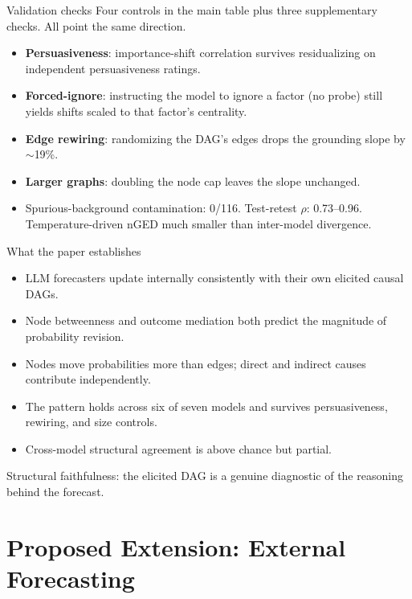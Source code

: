 \documentclass[aspectratio=169]{beamer}
\begin{document}
\begin{frame}{Validation checks}
Four controls in the main table plus three supplementary checks. All point the same direction.

\begin{itemize}
  \item \textbf{Persuasiveness}: importance-shift correlation survives residualizing on independent persuasiveness ratings.
  \item \textbf{Forced-ignore}: instructing the model to ignore a factor (no probe) still yields shifts scaled to that factor's centrality.
  \item \textbf{Edge rewiring}: randomizing the DAG's edges drops the grounding slope by $\sim$19\%.
  \item \textbf{Larger graphs}: doubling the node cap leaves the slope unchanged.
  \item Spurious-background contamination: 0/116. Test-retest $\rho$: 0.73--0.96. Temperature-driven nGED much smaller than inter-model divergence.
\end{itemize}
\end{frame}

\begin{frame}{What the paper establishes}
\begin{itemize}
  \item LLM forecasters update internally consistently with their own elicited causal DAGs.
  \item Node betweenness and outcome mediation both predict the magnitude of probability revision.
  \item Nodes move probabilities more than edges; direct and indirect causes contribute independently.
  \item The pattern holds across six of seven models and survives persuasiveness, rewiring, and size controls.
  \item Cross-model structural agreement is above chance but partial.
\end{itemize}

\vspace{0.7em}
\centering
Structural faithfulness: the elicited DAG is a genuine diagnostic of the reasoning behind the forecast.
\end{frame}

\section{Proposed Extension: External Forecasting}
\end{document}
